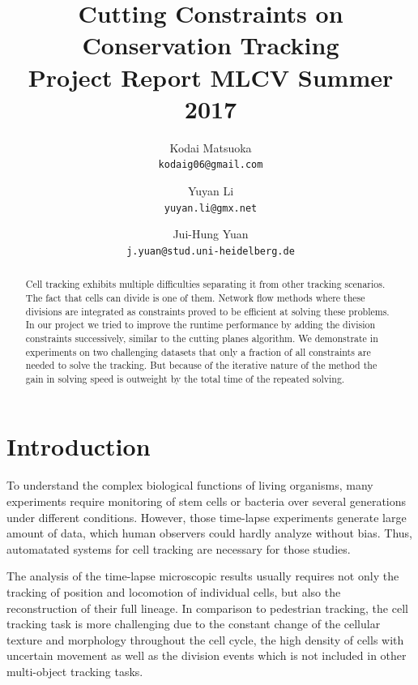 \documentclass[10pt,twocolumn,letterpaper]{article}
\begin{document}
\title{Cutting Constraints on Conservation Tracking\\
  \large{Project Report MLCV Summer 2017}
}

\author{Kodai Matsuoka\\
{\tt\small kodaig06@gmail.com}
\and
Yuyan Li\\
{\tt\small yuyan.li@gmx.net}
\and
Jui-Hung Yuan\\
{\tt\small j.yuan@stud.uni-heidelberg.de}
}

\maketitle

\begin{abstract}
  Cell tracking exhibits multiple difficulties separating it from other tracking scenarios. The fact that cells can divide is one of them. Network flow methods where these divisions are integrated as constraints proved to be efficient at solving these problems. In our project we tried to improve the runtime performance by adding the division constraints successively, similar to the cutting planes algorithm. We demonstrate in experiments on two challenging datasets that only a fraction of all constraints are needed to solve the tracking. But because of the iterative nature of the method the gain in solving speed is outweight by the total time of the repeated solving.
\end{abstract}

\section{Introduction}

To understand the complex biological functions of living organisms, many experiments require monitoring of stem cells or bacteria over several generations under different conditions. However, those time-lapse experiments generate large amount of data, which human observers could hardly analyze without bias. Thus, automatated systems for cell tracking are necessary for those studies.

The analysis of the time-lapse microscopic results usually requires not only the tracking of position and locomotion of individual cells, but also the reconstruction of their full lineage. In comparison to pedestrian tracking, the cell tracking task is more challenging due to the constant change of the cellular texture and morphology throughout the cell cycle, the high density of cells with uncertain movement as well as the division events which is not included in other multi-object tracking tasks.
\end{document}
